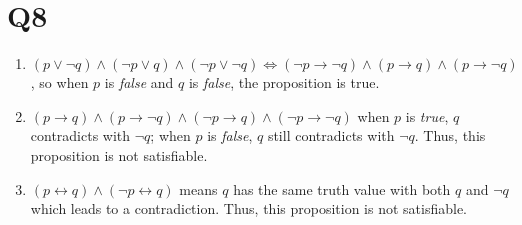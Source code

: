 \documentclass[11pt]{article}
\newenvironment{qparts}{\begin{enumerate}[{(}a{)}]}{\end{enumerate}}
\begin{document}
\section*{Q8}
\begin{qparts}
    
    \item $(p \lor \lnot q)\land (\lnot p \lor q) \land (\lnot p \lor \lnot q)
    \iff (\lnot p \to \lnot q) \land (p \to q) \land (p \to \lnot q)
    $, so when $p$ is \emph{false} and $q$ is \emph{false}, the proposition is true.
    
    \item $(p \to q) \land (p \to \lnot q) \land (\lnot p \to q) \land (\lnot p \to \lnot q)$ when $p$ is \emph{true}, $q$ contradicts with $\lnot q$; 
    when $p$ is \emph{false}, $q$ still contradicts with $\lnot q$. Thus,
    this proposition is not satisfiable.

    
    \item $(p \leftrightarrow q) \land (\lnot p \leftrightarrow q)$ means $q$
    has the same truth value with both $q$ and $\lnot q$ which leads to a contradiction. Thus, this proposition is not satisfiable.

\end{qparts}
\end{document}
